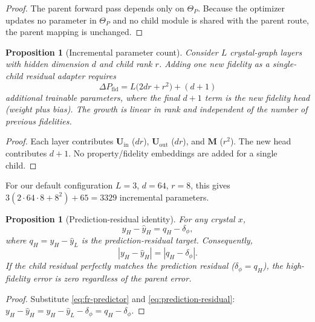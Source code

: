 \documentclass{article}
\theoremstyle{plain}
\newtheorem{proposition}[theorem]{Proposition}
\theoremstyle{definition}
\theoremstyle{remark}
\begin{document}
\begin{proof}
The parent forward pass depends only on $\Theta_P$. Because the optimizer updates no parameter in $\Theta_P$ and no child module is shared with the parent route, the parent mapping is unchanged.
\end{proof}

\begin{proposition}[Incremental parameter count]
\label{prop:growth}
Consider $L$ crystal-graph layers with hidden dimension $d$ and child rank $r$. Adding one new fidelity as a single-child residual adapter requires
\begin{equation}
\Delta P_{\mathrm{fid}} = L\bigl(2dr + r^2\bigr) + (d+1)
\end{equation}
additional trainable parameters, where the final $d+1$ term is the new fidelity head (weight plus bias). The growth is linear in rank and independent of the number of previous fidelities.
\end{proposition}

\begin{proof}
Each layer contributes $\mathbf U_{\mathrm{in}}$ ($dr$), $\mathbf U_{\mathrm{out}}$ ($dr$), and $\mathbf M$ ($r^2$). The new head contributes $d+1$. No property/fidelity embeddings are added for a single child.
\end{proof}

For our default configuration $L=3$, $d=64$, $r=8$, this gives $3(2\cdot64\cdot8 + 8^2) + 65 = 3329$ incremental parameters.

\begin{proposition}[Prediction-residual identity]
\label{prop:residual-identity}
For any crystal $x$,
\begin{equation}
y_H - \hat y_H = q_H - \delta_\phi,
\end{equation}
where $q_H = y_H - \hat y_L$ is the prediction-residual target. Consequently,
\begin{equation}
|y_H - \hat y_H| = |q_H - \delta_\phi|.
\end{equation}
If the child residual perfectly matches the prediction residual ($\delta_\phi = q_H$), the high-fidelity error is zero regardless of the parent error.
\end{proposition}

\begin{proof}
Substitute \cref{eq:fr-predictor} and \cref{eq:prediction-residual}:
$y_H - \hat y_H = y_H - \hat y_L - \delta_\phi = q_H - \delta_\phi$.
\end{proof}
\end{document}
